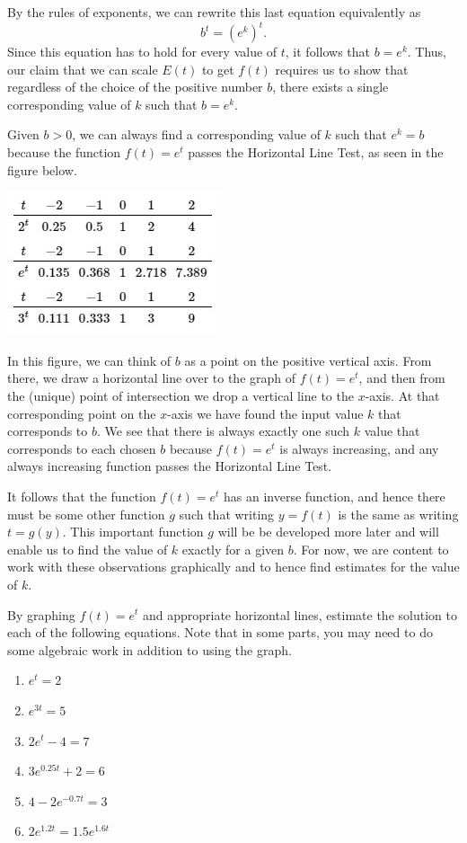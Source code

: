 \documentclass[nooutcomes]{ximera}
\begin{document}
By the rules of exponents, we can rewrite this last equation equivalently as%
\begin{equation*}
b^t = (e^k)^t\text{.}
\end{equation*}
Since this equation has to hold for every value of \(t\), it follows that \(b = e^k\).  Thus, our claim that we can scale \(E(t)\) to get \(f(t)\) requires us to show that regardless of the choice of the positive number \(b\), there exists a single corresponding value of \(k\) such that \(b = e^k\).

Given \(b \gt 0\), we can always find a corresponding value of \(k\) such that \(e^k = b\) because the function \(f(t) = e^t\) passes the Horizontal Line Test, as seen in the figure below.

\begin{image}
\includegraphics{ExpText14}
\end{image}

In this figure, we can think of \(b\) as a point on the positive vertical axis.  From there, we draw a horizontal line over to the graph of \(f(t) = e^t\), and then from the (unique) point of intersection we drop a vertical line to the \(x\)-axis.  At that corresponding point on the \(x\)-axis we have found the input value \(k\) that corresponds to \(b\).  We see that there is always exactly one such \(k\) value that corresponds to each chosen \(b\) because \(f(t) = e^t\) is always increasing, and any always increasing function passes the Horizontal Line Test.

It follows that the function \(f(t) = e^t\) has an inverse function, and hence there must be some other function \(g\) such that writing \(y = f(t)\) is the same as writing \(t = g(y)\).  This important function \(g\) will be be developed more later and will enable us to find the value of \(k\) exactly for a given \(b\).  For now, we are content to work with these observations graphically and to hence find estimates for the value of \(k\).

\begin{exploration}
By graphing \(f(t) = e^t\) and appropriate horizontal lines, estimate the solution to each of the following equations.  Note that in some parts, you may need to do some algebraic work in addition to using the graph.
\begin{enumerate}[label=\alph*.]
\item \(e^t = 2\)
\item \(e^{3t} = 5\)
\item \(2e^t - 4 = 7\)
\item \(3e^{0.25t} + 2 = 6\)
\item \(4 - 2e^{-0.7t} = 3\)
\item \(2e^{1.2t} = 1.5e^{1.6t}\)
\end{enumerate}
\end{exploration}
\end{document}
